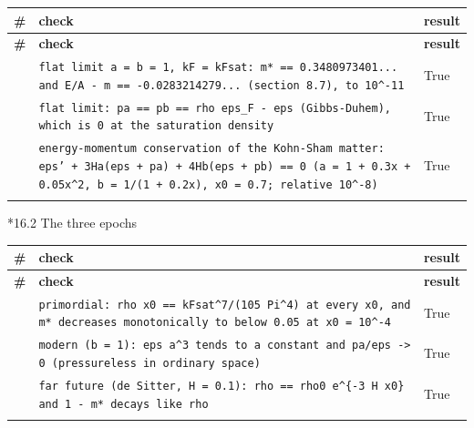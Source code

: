 \documentclass[10pt,a4paper]{article}
\makeatletter
\renewcommand\subsubsection{\@startsection{subsubsection}{3}{\z@}{-3.25ex\@plus -1ex \@minus -.2ex}{1.5ex \@plus .2ex}{\normalfont\normalsize\bfseries\raggedright}}
\makeatother
\begin{document}
{\footnotesize
\begin{longtable}{>{\raggedright\arraybackslash}p{}>{\raggedright\arraybackslash}p{}>{\raggedright\arraybackslash}p{}}
\toprule
\textbf{\#} & \textbf{check} & \textbf{result} \\
\midrule\endfirsthead
\toprule
\textbf{\#} & \textbf{check} & \textbf{result} \\
\midrule\endhead
\endfoot
\bottomrule\endlastfoot
320 & \texttt{flat limit a = b = 1, kF = kFsat: m* == 0.3480973401... and E/\allowbreak{}A - m == -0.0283214279... (section 8.7), to 10\textasciicircum{}-11} & True \\
321 & \texttt{flat limit: pa == pb == rho eps\_\allowbreak{}F - eps (Gibbs-Duhem), which is 0 at the saturation density} & True \\
322 & \texttt{energy-momentum conservation of the Kohn-Sham matter: eps' + 3Ha(eps + pa) + 4Hb(eps + pb) == 0 (a = 1 + 0.3x + 0.05x\textasciicircum{}2, b = 1/\allowbreak{}(1 + 0.2x), x0 = 0.7; relative 10\textasciicircum{}-8)} & True \\*
\end{longtable}}
\subsubsection*{16.2 The three epochs}
{\footnotesize
\begin{longtable}{>{\raggedright\arraybackslash}p{}>{\raggedright\arraybackslash}p{}>{\raggedright\arraybackslash}p{}}
\toprule
\textbf{\#} & \textbf{check} & \textbf{result} \\
\midrule\endfirsthead
\toprule
\textbf{\#} & \textbf{check} & \textbf{result} \\
\midrule\endhead
\endfoot
\bottomrule\endlastfoot
323 & \texttt{primordial: rho x0 == kFsat\textasciicircum{}7/\allowbreak{}(105 Pi\textasciicircum{}4) at every x0, and m* decreases monotonically to below 0.05 at x0 = 10\textasciicircum{}-4} & True \\
324 & \texttt{modern (b = 1): eps a\textasciicircum{}3 tends to a constant and pa/\allowbreak{}eps -> 0 (pressureless in ordinary space)} & True \\
325 & \texttt{far future (de Sitter, H = 0.1): rho == rho0 e\textasciicircum{}\{-3 H x0\} and 1 - m* decays like rho} & True \\*
\end{longtable}}
\end{document}

